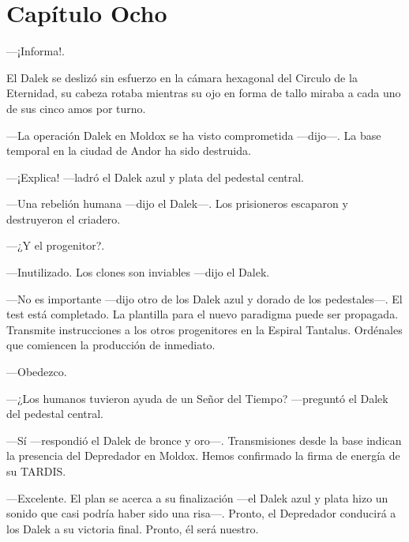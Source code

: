 \chapter*{Capítulo Ocho}

—¡Informa!.

El Dalek se deslizó sin esfuerzo en la cámara hexagonal del Circulo de la Eternidad, su cabeza rotaba mientras su ojo en forma de tallo miraba a cada uno de sus cinco amos por turno.

—La operación Dalek en Moldox se ha visto comprometida —dijo—. La base temporal en la ciudad de Andor ha sido destruida.

—¡Explica! —ladró el Dalek azul y plata del pedestal central.

—Una rebelión humana —dijo el Dalek—. Los prisioneros escaparon y destruyeron el criadero.

—¿Y el progenitor?.

—Inutilizado. Los clones son inviables —dijo el Dalek.

—No es importante —dijo otro de los Dalek azul y dorado de los pedestales—.  El test está completado. La plantilla para el nuevo paradigma puede ser propagada. Transmite instrucciones a los otros progenitores en la Espiral Tantalus. Ordénales que comiencen la producción de inmediato.

—Obedezco.

—¿Los humanos tuvieron ayuda de un Señor del Tiempo? —preguntó el Dalek del pedestal central.

—Sí —respondió el Dalek de bronce y oro—. Transmisiones desde la base indican la presencia del Depredador en Moldox. Hemos confirmado la firma de energía de su TARDIS.

—Excelente. El plan se acerca a su finalización —el Dalek azul y plata hizo un sonido que casi podría haber sido una risa—. Pronto, el Depredador conducirá a los Dalek a su victoria final. Pronto, él será nuestro.